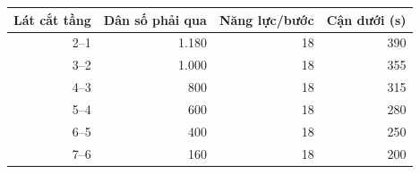 \small\begin{tabular}{rrrr}
\toprule
Lát cắt tầng & Dân số phải qua & Năng lực/bước & Cận dưới (s)\\\midrule
2--1 & 1.180 & 18 & 390\\
3--2 & 1.000 & 18 & 355\\
4--3 & 800 & 18 & 315\\
5--4 & 600 & 18 & 280\\
6--5 & 400 & 18 & 250\\
7--6 & 160 & 18 & 200\\
\bottomrule\end{tabular}
